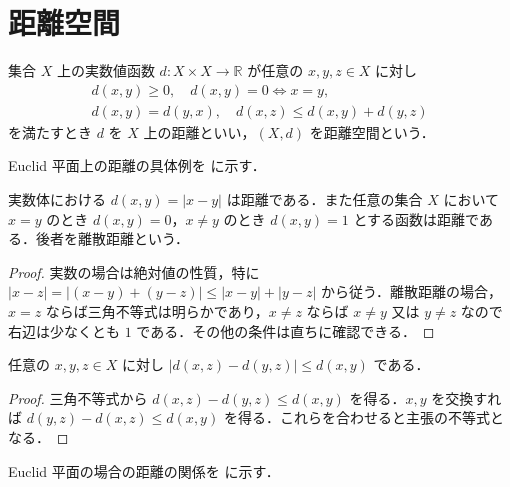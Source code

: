 \section{距離空間}
\begin{defn}[距離空間]
集合 $X$ 上の実数値函数 $d:X\times X\to\mathbb R$ が任意の $x,y,z\in X$ に対し
\[
\begin{gathered}
 d(x,y)\geq0,\quad d(x,y)=0\Leftrightarrow x=y,\\
 d(x,y)=d(y,x),\quad d(x,z)\leq d(x,y)+d(y,z)
\end{gathered}
\]
を満たすとき $d$ を $X$ 上の距離といい，$(X,d)$ を距離空間という．
\end{defn}
Euclid 平面上の距離の具体例を  に示す．
\begin{example}[実数の距離と離散距離]
実数体における $d(x,y)=|x-y|$ は距離である．また任意の集合 $X$ において $x=y$ のとき $d(x,y)=0$，$x\ne y$ のとき $d(x,y)=1$ とする函数は距離である．後者を離散距離という．
\end{example}
\begin{proof}
実数の場合は絶対値の性質，特に $|x-z|=|(x-y)+(y-z)|\leq|x-y|+|y-z|$ から従う．離散距離の場合，$x=z$ ならば三角不等式は明らかであり，$x\ne z$ ならば $x\ne y$ 又は $y\ne z$ なので右辺は少なくとも $1$ である．その他の条件は直ちに確認できる．
\end{proof}
\begin{prop}[距離の逆三角不等式]
任意の $x,y,z\in X$ に対し $|d(x,z)-d(y,z)|\leq d(x,y)$ である．
\end{prop}
\begin{proof}
三角不等式から $d(x,z)-d(y,z)\leq d(x,y)$ を得る．$x,y$ を交換すれば $d(y,z)-d(x,z)\leq d(x,y)$ を得る．これらを合わせると主張の不等式となる．
\end{proof}
Euclid 平面の場合の距離の関係を  に示す．
